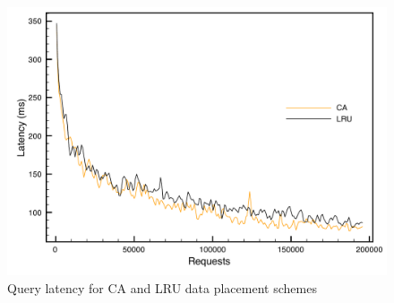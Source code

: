 \begin{figure}
\begin{center}
\includegraphics[scale=0.5]{figures/hierarchy-latency.pdf}
\end{center}
\caption{Query latency for CA and LRU data placement schemes}
\label{fig:hierarchy-latency}
\end{figure}

